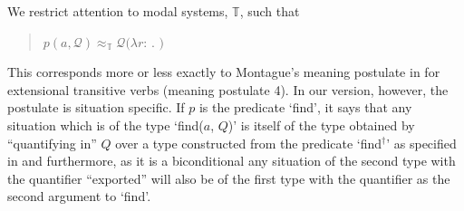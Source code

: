  
 

\begin{ex} 
  We restrict attention to modal systems, $\mathbb{T}$, such that
  \begin{quote}
  $p(a,\mathcal{Q})\approx_{\mathbb{T}}\mathcal{Q}(\lambda
 r$: . $)$
  \end{quote}
\label{ex:mp-find} 
\end{ex} 
This corresponds more or less exactly to Montague's meaning postulate
in \cite{Montague1973} for extensional transitive verbs (meaning
postulate 4).  In our version, however, the postulate is situation
specific.  If $p$ is the predicate `find', it says that any situation which is of the type `find($a$,
$Q$)' is itself of the type obtained by ``quantifying in'' $Q$ over a
type constructed from the predicate `find$^{\dagger}$' as specified
in \preveg{} and furthermore, as it is a biconditional any situation
of the second type with the quantifier ``exported'' will also be of
the first type with the quantifier as the second argument to `find'.

